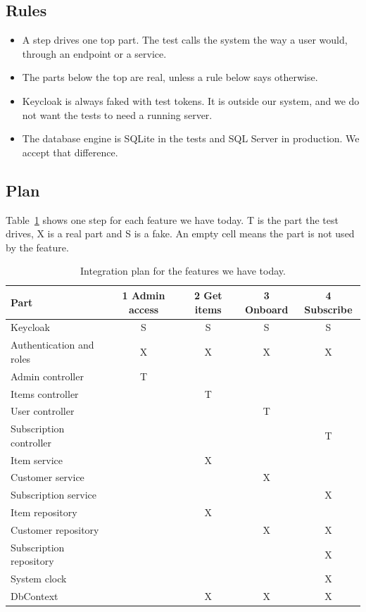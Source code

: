 \documentclass[a4paper,11pt]{article}
\begin{document}
\subsection{Rules}
\begin{itemize}
  \item A step drives one top part. The test calls the system the way a user would, through an endpoint or a service.
  \item The parts below the top are real, unless a rule below says otherwise.
  \item Keycloak is always faked with test tokens. It is outside our system, and we do not want the tests to need a running server.
  \item The database engine is SQLite in the tests and SQL Server in production. We accept that difference.
\end{itemize}

\subsection{Plan}
Table~\ref{tab:integration-plan} shows one step for each feature we have today. T is the part the test drives, X is a real part and S is a fake. An empty cell means the part is not used by the feature.

\begin{table}[H]
\centering
\small
{}
\begin{tabular}{@{}l c c c c@{}}
\textbf{Part} & \textbf{1 Admin access} & \textbf{2 Get items} & \textbf{3 Onboard} & \textbf{4 Subscribe} \\
\hline
Keycloak & S & S & S & S \\
Authentication and roles & X & X & X & X \\
Admin controller & T & & & \\
Items controller & & T & & \\
User controller & & & T & \\
Subscription controller & & & & T \\
Item service & & X & & \\
Customer service & & & X & \\
Subscription service & & & & X \\
Item repository & & X & & \\
Customer repository & & & X & X \\
Subscription repository & & & & X \\
System clock & & & & X \\
DbContext & & X & X & X \\
\end{tabular}
\caption{Integration plan for the features we have today.}
\label{tab:integration-plan}
\end{table}
\end{document}
